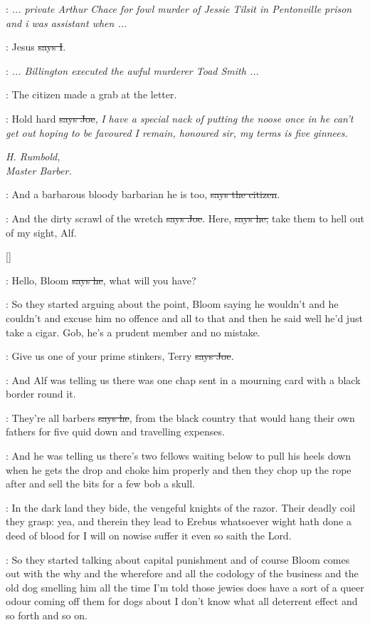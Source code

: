 \joe:
\emph{... private Arthur Chace for fowl murder of Jessie Tilsit in
Pentonville prison and i was assistant when ...}

:
Jesus \sout{says I}.

\joe:
\emph{... Billington executed the awful murderer Toad Smith ...}

\Nq:
The citizen made a grab at the letter.

\joe:
Hold hard \sout{says Joe},
\emph{I have a special nack of putting the noose once in
he can't get out hoping to be favoured I remain, honoured sir, my terms is
five ginnees.}

\emph{H. Rumbold, \\
Master Barber.}

\citizen:
And a barbarous bloody barbarian he is too,
\sout{says the citizen}.

\joe:
And the dirty scrawl of the wretch \sout{says Joe}.
Here, \sout{says he,} take them
to hell out of my sight, Alf.

[]

\joe:
Hello, Bloom \sout{says he}, what will you have?

\Nq:
So they started arguing about the point, Bloom saying he wouldn't
and he couldn't and excuse him no offence and all to that and then he said
well he'd just take a cigar. Gob, he's a prudent member and no mistake.

\joe:
Give us one of your prime stinkers,
Terry \sout{says Joe}.

\Nq:
And Alf was telling us there was one chap sent in a mourning card
with a black border round it.

\bergan:
They're all barbers \sout{says he},
from the black country that would hang
their own fathers for five quid down and travelling expenses.

\Nq:
And he was telling us there's two fellows waiting below to pull his
heels down when he gets the drop and choke him properly and then they
chop up the rope after and sell the bits for a few bob a skull.

:
In the dark land they bide, the vengeful knights of the razor. Their
deadly coil they grasp: yea, and therein they lead to Erebus whatsoever
wight hath done a deed of blood for I will on nowise suffer it even so
saith the Lord.

\Nq:
So they started talking about capital punishment and of course Bloom
comes out with the why and the wherefore and all the codology of the
business and the old dog smelling him all the time I'm told those jewies
does have a sort of a queer odour coming off them for dogs about I don't
know what all deterrent effect and so forth and so on.

